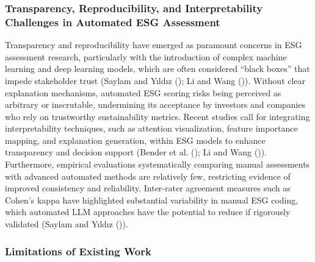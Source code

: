 \documentclass[
  12pt,
]{article}
\begin{document}
\subsubsection{Transparency, Reproducibility, and Interpretability
Challenges in Automated ESG
Assessment}\label{transparency-reproducibility-and-interpretability-challenges-in-automated-esg-assessment}

Transparency and reproducibility have emerged as paramount concerns in
ESG assessment research, particularly with the introduction of complex
machine learning and deep learning models, which are often considered
``black boxes'' that impede stakeholder trust (Saylam and Yıldız
(); Li and Wang
()). Without clear explanation mechanisms,
automated ESG scoring risks being perceived as arbitrary or inscrutable,
undermining its acceptance by investors and companies who rely on
trustworthy sustainability metrics. Recent studies call for integrating
interpretability techniques, such as attention visualization, feature
importance mapping, and explanation generation, within ESG models to
enhance transparency and decision support (Bender et al.
(); Li and Wang
()). Furthermore, empirical evaluations
systematically comparing manual assessments with advanced automated
methods are relatively few, restricting evidence of improved consistency
and reliability. Inter-rater agreement measures such as Cohen's kappa
have highlighted substantial variability in manual ESG coding, which
automated LLM approaches have the potential to reduce if rigorously
validated (Saylam and Yıldız ()).

\subsubsection{Limitations of Existing
Work}\label{limitations-of-existing-work}
\end{document}
